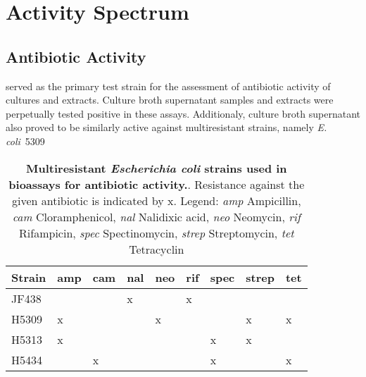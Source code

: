 


\section{Activity Spectrum} %
\label{sec:activity_spectrum}


\subsection{Antibiotic Activity} %
\label{sub:antibiotic_activity}

\coli{} served as the primary test strain for the assessment of antibiotic activity of \tue{} cultures and extracts.
Culture broth supernatant samples and extracts were perpetually tested positive in these assays.
Additionaly, culture broth supernatant also proved to be similarly active against multiresistant strains, namely \emph{E. coli}~5309 

\begin{table}[htbp]
\caption[Multiresistant \emph{Escherichia coli} strains used in bioassays for antibiotic activity.]{%
	\textbf{Multiresistant \emph{Escherichia coli} strains used in bioassays for antibiotic activity.}.
    Resistance against the given antibiotic is indicated by x.
    Legend:
    \emph{amp} Ampicillin,
    \emph{cam} Cloramphenicol,
    \emph{nal} Nalidixic acid,
    \emph{neo} Neomycin,
    \emph{rif} Rifampicin,
    \emph{spec} Spectinomycin,
    \emph{strep} Streptomycin,
    \emph{tet} Tetracyclin
}
\label{tab:resistant_colis}
\centering
\begin{tabularx}{\textwidth}{XXXXXXXXX}
    \toprule
    Strain 	& amp 	& cam 	& nal 	& neo 	& rif 	& spec 	& strep 	& tet 	\\
    \midrule
    JF438 	&		&		& x		&		& x		& 		&			&		\\
    H5309	& x		& 		&		& x		&		&		& x			& x		\\
    H5313 	& x		&		&		&		&		& x		& x			&  		\\
    H5434 	& 		& x		& 		&		&		& x		&			& x 	\\
    \bottomrule
\end{tabularx}
\end{table}

